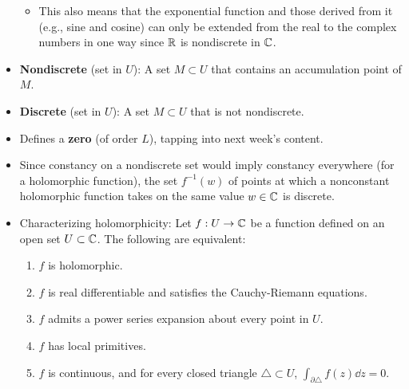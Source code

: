 \documentclass[../notes.tex]{subfiles}
\begin{document}
\begin{itemize}
\begin{itemize}
        \item This also means that the exponential function and those derived from it (e.g., sine and cosine) can only be extended from the real to the complex numbers in one way since $\mathbb{R}$ is nondiscrete in $\mathbb{C}$.
    \end{itemize}
    \item \textbf{Nondiscrete} (set in $U$): A set $M\subset U$ that contains an accumulation point of $M$.
    \item \textbf{Discrete} (set in $U$): A set $M\subset U$ that is not nondiscrete.
    \item Defines a \textbf{zero} (of order $L$), tapping into next week's content.
    \item Since constancy on a nondiscrete set would imply constancy everywhere (for a holomorphic function), the set $f^{-1}(w)$ of points at which a nonconstant holomorphic function takes on the same value $w\in\mathbb{C}$ is discrete.
    \item Characterizing holomorphicity: Let $f:U\to\mathbb{C}$ be a function defined on an open set $U\subset\mathbb{C}$. The following are equivalent:
    \begin{enumerate}[label={\roman*.}]
        \item $f$ is holomorphic.
        \item $f$ is real differentiable and satisfies the Cauchy-Riemann equations.
        \item $f$ admits a power series expansion about every point in $U$.
        \item $f$ has local primitives.
        \item $f$ is continuous, and for every closed triangle $\triangle\subset U$, $\int_{\partial\triangle}f(z)\dd{z}=0$.
    \end{enumerate}
\end{itemize}
\end{document}
